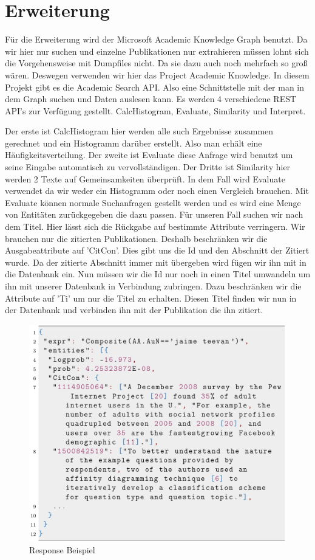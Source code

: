 
\section{Erweiterung}
Für die Erweiterung wird der Microsoft Academic Knowledge Graph benutzt. Da wir hier nur suchen und einzelne Publikationen nur extrahieren müssen lohnt sich die Vorgehensweise mit Dumpfiles nicht. Da sie dazu auch noch mehrfach so groß wären. Deswegen verwenden wir hier das Project Academic Knowledge. In diesem Projekt gibt es die Academic Search API. Also eine Schnittstelle mit der man in dem Graph suchen und Daten auslesen kann. Es werden 4 verschiedene REST API's zur Verfügung gestellt. CalcHistogram, Evaluate, Similarity und Interpret. 

Der erste ist CalcHistogram hier werden alle such Ergebnisse zusammen gerechnet und ein Histogramm darüber erstellt. Also man erhält eine Häufigkeitsverteilung. Der zweite ist Evaluate diese Anfrage wird benutzt um seine Eingabe automatisch zu vervollständigen. Der Dritte ist Similarity hier werden 2 Texte auf Gemeinsamkeiten überprüft. In dem Fall wird Evaluate verwendet da wir weder ein Histogramm oder noch einen Vergleich brauchen. Mit Evaluate können normale Suchanfragen gestellt werden und es wird eine Menge von Entitäten zurückgegeben die dazu passen. Für unseren Fall suchen wir nach dem Titel. Hier lässt sich die Rückgabe auf bestimmte Attribute verringern. Wir brauchen nur die zitierten Publikationen. Deshalb beschränken wir die Ausgabeattribute auf 'CitCon'. Dies gibt uns die Id und den Abschnitt der Zitiert wurde. Da der zitierte Abschnitt immer mit übergeben wird fügen wir ihn mit in die Datenbank ein. Nun müssen wir die Id nur noch in einen Titel umwandeln um ihn mit unserer Datenbank in Verbindung zubringen. Dazu beschränken wir die Attribute auf 'Ti' um nur die Titel zu erhalten. Diesen Titel finden wir nun in der Datenbank und verbinden ihn mit der Publikation die ihn zitiert.

\begin{figure}[!htb]
	\centering
	\includegraphics[width=12cm,keepaspectratio]{bilder/ResponseBeispiel}
	\caption{Response Beispiel}
	\label{fig:response-beispiel}
\end{figure}

